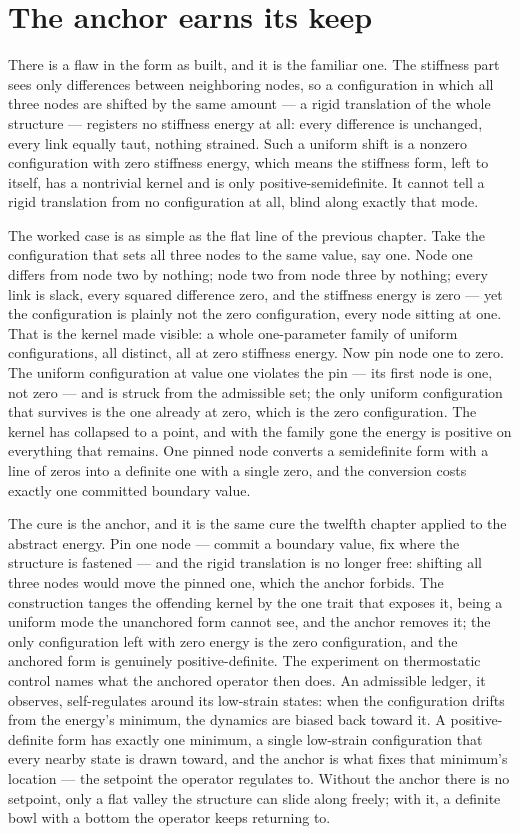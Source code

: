 \section{The anchor earns its keep}
\label{se:the-anchor-earns-its-keep}

There is a flaw in the form as built, and it is the familiar one. The stiffness part sees only
differences between neighboring nodes, so a configuration in which all three nodes are shifted by the
same amount --- a rigid translation of the whole structure --- registers no stiffness energy at all:
every difference is unchanged, every link equally taut, nothing strained. Such a uniform shift is a
nonzero configuration with zero stiffness energy, which means the stiffness form, left to itself, has a
nontrivial kernel and is only positive-semidefinite. It cannot tell a rigid translation from no
configuration at all, blind along exactly that mode.

The worked case is as simple as the flat line of the previous chapter. Take the configuration that sets
all three nodes to the same value, say one. Node one differs from node two by nothing; node two from
node three by nothing; every link is slack, every squared difference zero, and the stiffness energy is
zero --- yet the configuration is plainly not the zero configuration, every node sitting at one. That is
the kernel made visible: a whole one-parameter family of uniform configurations, all distinct, all at
zero stiffness energy. Now pin node one to zero. The uniform configuration at value one violates the
pin --- its first node is one, not zero --- and is struck from the admissible set; the only uniform
configuration that survives is the one already at zero, which is the zero configuration. The kernel has
collapsed to a point, and with the family gone the energy is positive on everything that remains. One
pinned node converts a semidefinite form with a line of zeros into a definite one with a single zero,
and the conversion costs exactly one committed boundary value.

The cure is the anchor, and it is the same cure the twelfth chapter applied to the abstract energy.
Pin one node --- commit a boundary value, fix where the structure is fastened --- and the rigid
translation is no longer free: shifting all three nodes would move the pinned one, which the anchor
forbids. The construction tanges the offending kernel by the one trait that exposes it, being a uniform
mode the unanchored form cannot see, and the anchor removes it; the only configuration left with zero
energy is the zero configuration, and the anchored form is genuinely positive-definite. The experiment
on thermostatic control names what the anchored operator then does. An admissible ledger, it observes,
self-regulates around its low-strain states: when the configuration drifts from the energy's minimum,
the dynamics are biased back toward it. A positive-definite form has exactly one minimum, a single
low-strain configuration that every nearby state is drawn toward, and the anchor is what fixes that
minimum's location --- the setpoint the operator regulates to. Without the anchor there is no setpoint,
only a flat valley the structure can slide along freely; with it, a definite bowl with a bottom the
operator keeps returning to.

